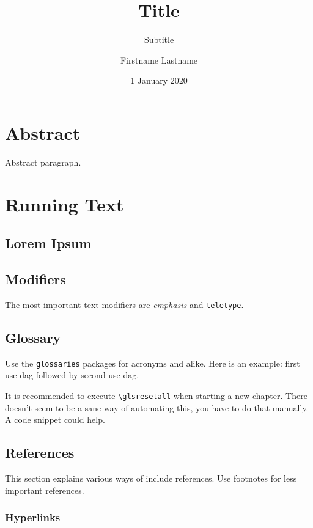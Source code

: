 \documentclass[parskip=half]{scrbook}
\title{Title}
\subtitle{Subtitle}
\author{Firstname Lastname}
\date{1 January 2020}
\providecommand{\listoflistings}{\lstlistoflistings}
\begin{document}
\frontmatter
\maketitle
\tableofcontents
\listoffigures
\listoftables
\listoflistings

\chapter*{Abstract}

Abstract paragraph.

\mainmatter

\chapter{Running Text}

\section{Lorem Ipsum}

\lipsum[1-2]

\section{Modifiers}

The most important text modifiers are \emph{emphasis} and \texttt{teletype}.

\section{Glossary}

Use the \texttt{glossaries} packages for acronyms and alike.
Here is an example: first use \gls{dag} followed by second use \gls{dag}.

It is recommended to execute \texttt{\textbackslash{}glsresetall} when starting a new chapter.
There doesn't seem to be a sane way of automating this, you have to do that manually.
A code snippet could help.

\section{References}

This section explains various ways of include references.
Use footnotes for less important references.

\subsection{Hyperlinks}
\end{document}
